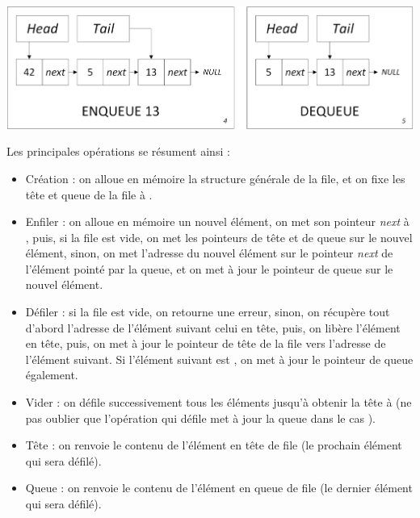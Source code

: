 \begin{center}
\includegraphics[scale=0.60]{Cours/Files_4_Liste_Chainee_Usage_pack_2.png}
\end{center}

\smallskip

Les principales opérations se résument ainsi :
\begin{itemize}
\item Création : on alloue en mémoire la structure générale de la file, et on fixe les tête et queue de la file à .
\item Enfiler : on alloue en mémoire un nouvel élément, on met son pointeur \textit{next} à , puis, si la file est vide, on met les pointeurs de tête et de queue sur le nouvel élément, sinon, on met l'adresse du nouvel élément sur le pointeur \textit{next} de l'élément pointé par la queue, et on met à jour le pointeur de queue sur le nouvel élément.
\item Défiler : si la file est vide, on retourne une erreur, sinon, on récupère tout d'abord l'adresse de l'élément suivant celui en tête, puis, on libère l'élément en tête, puis, on met à jour le pointeur de tête de la file vers l'adresse de l'élément suivant. Si l'élément suivant est , on met à jour le pointeur de queue également.
\item Vider : on défile successivement tous les éléments jusqu'à obtenir la tête à  (ne pas oublier que l'opération qui défile met à jour la queue dans le cas ).
\item Tête : on renvoie le contenu de l'élément en tête de file (le prochain élément qui sera défilé).
\item Queue : on renvoie le contenu de l'élément en queue de file (le dernier élément qui sera défilé).
\end{itemize}

\bigskip


